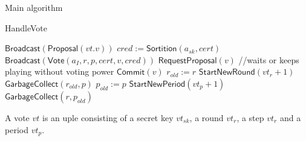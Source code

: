 \documentclass[10pt,a4paper]{article}
\begin{document}
\begin{section}{Main algorithm}
\begin{subsection}{HandleVote}
\begin{algorithm}[H]
\begin{algorithmic}[1]
                    \State $\mathsf{Broadcast}(\mathsf{Proposal}(vt.v))$
                \EndIf
                        \State $cred := 
                        \mathsf{Sortition}(a_{sk}, cert)$
                            \State $\mathsf{Broadcast}(\mathsf{Vote}(a_I, r, p, cert, v, cred))$
                        \EndIf
                    \EndFor
                \EndIf
                        \State $\mathsf{RequestProposal}(v)$ //waits or keeps playing without voting power
                    \EndIf
                    \State $\mathsf{Commit}(v)$  %
                    \State $r_{old} := r$
                    \State $\mathsf{StartNewRound}(vt_r+1)$
                    \State $\mathsf{GarbageCollect}(r_{old}, p)$
                \EndIf
                    \State $p_{old} := p$
                    \State $\mathsf{StartNewPeriod}(vt_p + 1)$
                    \State $\mathsf{GarbageCollect}(r, p_{old})$
                \EndIf
            \EndIf

        \EndFunction
        \end{algorithmic}
    \end{algorithm}
    
A vote $vt$ is an uple consisting of a secret key $vt_{sk}$, a round $vt_r$, a step $vt_r$ and a period $vt_p$.
    

\end{subsection}
\end{section}
\end{document}
